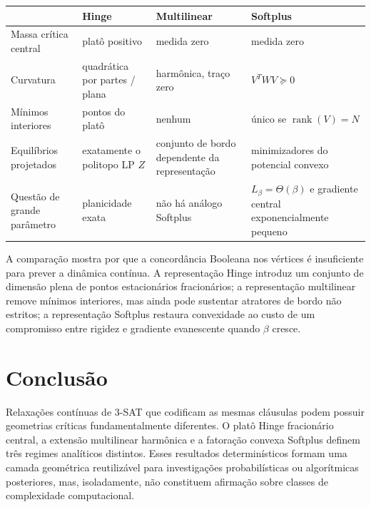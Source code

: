 \documentclass[11pt,a4paper]{article}
\begin{document}
\begin{center}
\small
\begin{tabularx}{\textwidth}{@{}lXXX@{}}
\toprule
& Hinge & Multilinear & Softplus\\
\midrule
Massa crítica central & platô positivo & medida zero & medida zero\\
Curvatura & quadrática por partes / plana & harmônica, traço zero & $V^TWV\succeq0$\\
Mínimos interiores & pontos do platô & nenhum & único se $\operatorname{rank}(V)=N$\\
Equilíbrios projetados & exatamente o politopo LP $Z$ & conjunto de bordo dependente da representação & minimizadores do potencial convexo\\
Questão de grande parâmetro & planicidade exata & não há análogo Softplus & $L_\beta=\Theta(\beta)$ e gradiente central exponencialmente pequeno\\
\bottomrule
\end{tabularx}
\end{center}

A comparação mostra por que a concordância Booleana nos vértices é insuficiente para prever a dinâmica contínua. A representação Hinge introduz um conjunto de dimensão plena de pontos estacionários fracionários; a representação multilinear remove mínimos interiores, mas ainda pode sustentar atratores de bordo não estritos; a representação Softplus restaura convexidade ao custo de um compromisso entre rigidez e gradiente evanescente quando $\beta$ cresce.

\section{Conclusão}
Relaxações contínuas de 3-SAT que codificam as mesmas cláusulas podem possuir geometrias críticas fundamentalmente diferentes. O platô Hinge fracionário central, a extensão multilinear harmônica e a fatoração convexa Softplus definem três regimes analíticos distintos. Esses resultados determinísticos formam uma camada geométrica reutilizável para investigações probabilísticas ou algorítmicas posteriores, mas, isoladamente, não constituem afirmação sobre classes de complexidade computacional.
\end{document}
